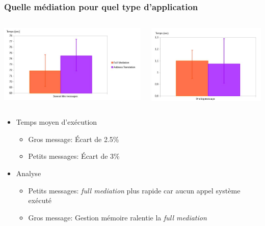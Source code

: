 \documentclass[10.5pt]{beamer}
\begin{document}
\begin{frame}
  \frametitle{Quelle médiation pour quel type d'application}
  \begin{columns}[c]
    \begin{column}{4cm} 
   \includegraphics[scale=0.23]{mesures/graph/Littlemsg_pres.jpg}
   \end{column}
    \begin{column}{4cm}
   \includegraphics[scale=0.23]{mesures/graph/Bigmsg_pres.jpg}
    \end{column}
  \end{columns}
  
  \begin{itemize}
  \item Temps moyen d'exécution
    \begin{itemize}
    \item Gros message: Écart de 2.5\%
    \item Petits messages: Écart de 3\%
    \end{itemize}
  \item<2-> Analyse
    \begin{itemize}
    \item<2-> Petits messages: \textit{full mediation} plus rapide car aucun appel système exécuté
    \item<2-> Gros message: Gestion mémoire ralentie la \textit{full mediation}
    \end{itemize}
  \end{itemize}

\end{frame}
\end{document}
